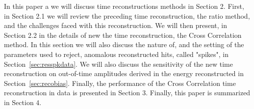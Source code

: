 In this paper a we will discuss time reconstructions methods in Section 2. First, in Section 2.1 we will review the preceding time reconstruction, the ratio method, and the challenges faced with this reconstruction. We will then present, in Section 2.2 in the details of new the time reconstruction, the Cross Correlation method. In this section we will also discuss the nature of, and the setting of the parameters used to reject, anomalous reconstructed hits, called "spikes", in Section~\ref{sec:resspkdata}. We will also discuss the sensitivity of the new time reconstruction on out-of-time amplitudes derived in the energy reconstructed in Section~\ref{sec:recobias}.  Finally, the performance of the Cross Correlation time reconstruction in data is presented in Section 3.  Finally, this paper is summarized in Section 4.



